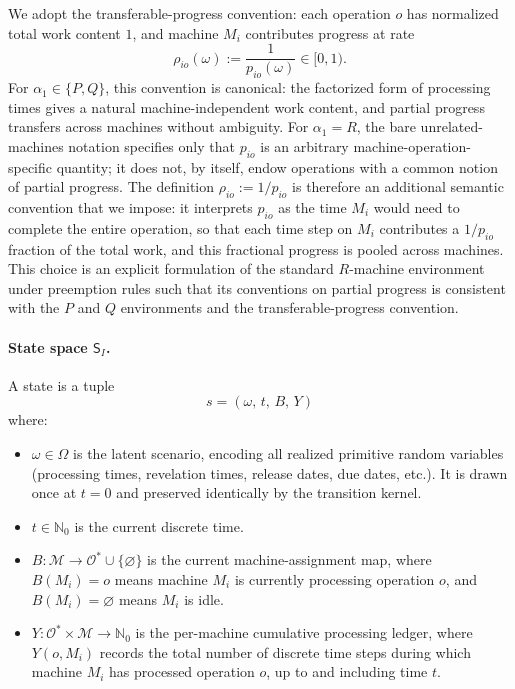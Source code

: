 We adopt the transferable-progress convention: each operation $o$ has normalized total work content $1$, and machine $M_i$ contributes progress at rate
\[
\rho_{io}(\omega) := \frac{1}{p_{io}(\omega)} \in [0, 1).
\]
For $\alpha_1 \in \{P, Q\}$, this convention is canonical: the factorized form of processing times gives a natural machine-independent work content, and partial progress transfers across machines without ambiguity. For $\alpha_1 = R$, the bare unrelated-machines notation specifies only that $p_{io}$ is an arbitrary machine-operation-specific quantity; it does not, by itself, endow operations with a common notion of partial progress. The definition $\rho_{io} := 1/p_{io}$ is therefore an additional semantic convention that we impose: it interprets $p_{io}$ as the time $M_i$ would need to complete the entire operation, so that each time step on $M_i$ contributes a $1/p_{io}$ fraction of the total work, and this fractional progress is pooled across machines. This choice is an explicit formulation of the standard $R$-machine environment under preemption rules such that its conventions on partial progress is consistent with the $P$ and $Q$ environments and the transferable-progress convention. 


\paragraph{State space $\mathsf{S}_I$.}

A state is a tuple
\[
s = (\omega,\, t,\, B,\, Y)
\]
where:
\begin{itemize}
    \item $\omega \in \Omega$ is the latent scenario, encoding all realized primitive
    random variables (processing times, revelation times, release dates, due dates,
    etc.). It is drawn once at $t = 0$ and preserved identically by the transition
    kernel.
    \item $t \in \mathbb{N}_0$ is the current discrete time.
    \item $B : \mathcal{M} \to \mathcal{O}^* \cup \{\varnothing\}$ is the current
    machine-assignment map, where $B(M_i) = o$ means machine $M_i$ is currently
    processing operation $o$, and $B(M_i) = \varnothing$ means $M_i$ is idle.
    \item $Y : \mathcal{O}^* \times \mathcal{M} \to \mathbb{N}_0$ is the per-machine cumulative processing ledger, where $Y(o, M_i)$ records the total number of discrete time steps during which machine $M_i$ has processed operation $o$, up to and including time $t$.
\end{itemize}

